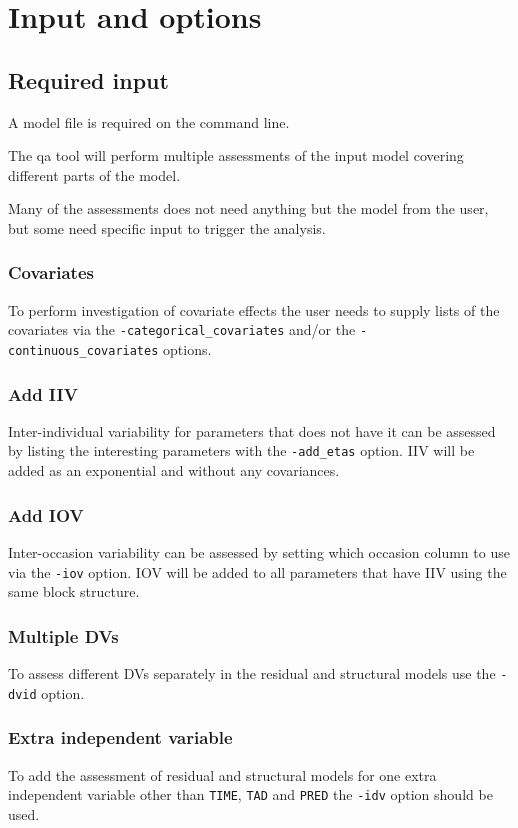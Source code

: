 \section{Input and options}

\subsection{Required input}
A model file is required on the command line.

    The qa tool will perform multiple assessments of the input model covering
    different parts of the model.

    Many of the assessments does not need anything but the model from the user,
    but some need specific input to trigger the analysis.

\subsubsection{Covariates}
    To perform investigation of covariate effects the user needs to supply lists
    of the covariates via the \verb|-categorical_covariates| and/or the
    \verb|-continuous_covariates| options.

\subsubsection{Add IIV}
    Inter-individual variability for parameters that does not have it can be
    assessed by listing the interesting parameters with the \verb|-add_etas| option.
    IIV will be added as an exponential and without any covariances.

\subsubsection{Add IOV}
    Inter-occasion variability can be assessed by setting which occasion
    column to use via the \verb|-iov| option. IOV will be added to all parameters
    that have IIV using the same block structure.

\subsubsection{Multiple DVs}
    To assess different DVs separately in the residual and structural models
    use the \verb|-dvid| option.

\subsubsection{Extra independent variable}
    To add the assessment of residual and structural models for one
    extra independent variable other than \verb|TIME|, \verb|TAD| and \verb|PRED| the
    \verb|-idv| option should be used.



